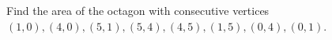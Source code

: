 Find the area of the octagon with consecutive vertices $(1,0),(4,0),(5,1),(5,4),(4,5),(1,5),(0,4),(0,1)$.
